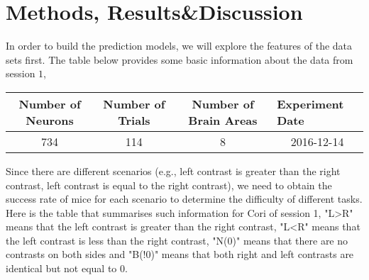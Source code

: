 \documentclass[12pt]{article}
\begin{document}
\section{Methods, Results\&Discussion}
In order to build the prediction models, we will explore the features of the data sets first. The table below provides some basic information about the data from session $1$,
\begin{table}[ht]
\begin{center}
\begin{tabular}{|c|c|c|l|}
\hline
Number of Neurons & Number of Trials & Number of Brain Areas & Experiment Date                 \\ \hline
734               & 114              & 8                     & \multicolumn{1}{c|}{2016-12-14} \\ \hline
\end{tabular}
\end{center}
\end{table}
Since there are different scenarios (e.g., left contrast is greater than the right contrast, left contrast is equal to the right contrast), we need to obtain the success rate of mice for each scenario to determine the difficulty of different tasks. Here is the table that summarises such information for Cori of session 1, "L>R" means that the left contrast is greater than the right contrast, "L<R" means that the left contrast is less than the right contrast, "N(0)" means that there are no contrasts on both sides and "B(!0)" means that both right and left contrasts are identical but not equal to $0$. 
\end{document}
